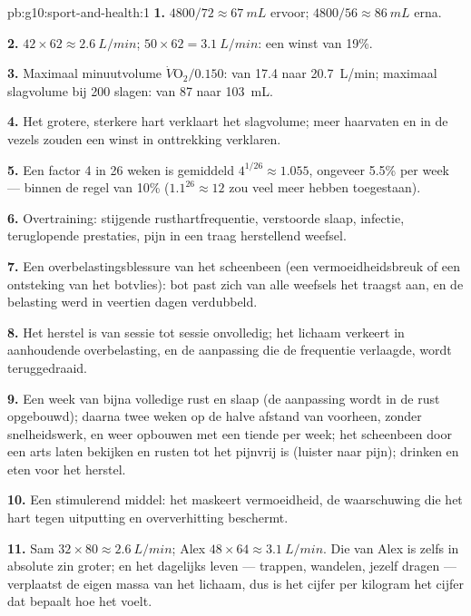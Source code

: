 \begin{solution}{pb:g10:sport-and-health:1}
\textbf{1.} $4800/72 \approx \qty{67}{mL}$ ervoor; $4800/56 \approx
\qty{86}{mL}$ erna.

\textbf{2.} $42 \times 62 \approx \qty{2.6}{L/min}$; $50 \times 62 =
\qty{3.1}{L/min}$: een winst van 19\%.

\textbf{3.} Maximaal minuutvolume $\dot V\!\mathrm{O_2}/0.150$: van
\num{17.4} naar \qty{20.7}{L/min}; maximaal slagvolume bij 200 slagen:
van \num{87} naar \qty{103}{mL}.

\textbf{4.} Het grotere, sterkere hart verklaart het slagvolume; meer
haarvaten en  in de vezels zouden een winst in onttrekking
verklaren.

\textbf{5.} Een factor 4 in 26 weken is gemiddeld $4^{1/26}
\approx 1.055$, ongeveer 5.5\% per week --- binnen de regel van 10\% ($1.1^{26}
\approx 12$ zou veel meer hebben toegestaan).

\textbf{6.} Overtraining: stijgende rusthartfrequentie, verstoorde slaap,
infectie, teruglopende prestaties, pijn in een traag herstellend weefsel.

\textbf{7.} Een overbelastingsblessure van het scheenbeen (een
vermoeidheidsbreuk of een ontsteking van het botvlies): bot past zich van
alle weefsels het traagst aan, en de belasting werd in veertien dagen
verdubbeld.

\textbf{8.} Het herstel is van sessie tot sessie onvolledig; het lichaam
verkeert in aanhoudende overbelasting, en de aanpassing die de frequentie
verlaagde, wordt teruggedraaid.

\textbf{9.} Een week van bijna volledige rust en slaap (de aanpassing
wordt in de rust opgebouwd); daarna twee weken op de halve afstand van
voorheen, zonder snelheidswerk, en weer opbouwen met een tiende per week;
het scheenbeen door een arts laten bekijken en rusten tot het pijnvrij is
(luister naar pijn); drinken en eten voor het herstel.

\textbf{10.} Een stimulerend middel: het maskeert vermoeidheid, de
waarschuwing die het hart tegen uitputting en oververhitting beschermt.

\textbf{11.} Sam $32 \times 80 \approx \qty{2.6}{L/min}$; Alex $48
\times 64 \approx \qty{3.1}{L/min}$. Die van Alex is zelfs in absolute
zin groter; en het dagelijks leven --- trappen, wandelen, jezelf dragen
--- verplaatst de eigen massa van het lichaam, dus is het cijfer per
kilogram het cijfer dat bepaalt hoe het voelt.


\end{solution}
